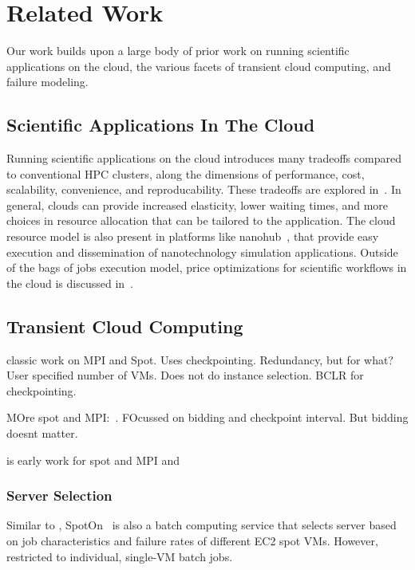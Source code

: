 \section{Related Work}
\label{sec:related}
Our work builds upon a large body of prior work on running scientific applications on the cloud, the various facets of transient cloud computing, and failure modeling. 

\subsection{Scientific Applications In The Cloud}

Running scientific applications on the cloud introduces many tradeoffs compared to conventional HPC clusters, along the dimensions of performance, cost, scalability, convenience, and reproducability.
These tradeoffs are explored in~\cite{iosup_performance_2011, zhai_cloud_2011, marathe2013comparative, galante_analysis_2016, benedictis_cloud-aware_2014}.
In general, clouds can provide increased elasticity, lower waiting times, and more choices in resource allocation that can be tailored to the application.
The cloud resource model is also present in platforms like nanohub~\cite{nanohub}, that provide easy execution and dissemination of nanotechnology simulation applications.
Outside of the bags of jobs execution model, price optimizations for scientific workflows in the cloud is discussed in~\cite{gari_learning_2019}. 



\subsection{Transient Cloud Computing} 

\cite{marathe2014exploiting} classic work on MPI and Spot.
Uses checkpointing.
Redundancy, but for what?
User specified number of VMs. Does not do instance selection. 
BCLR for checkpointing.



MOre spot and MPI:~\cite{gong_monetary_2015}. FOcussed on bidding and checkpoint interval. But bidding doesnt matter. 


\cite{xiang_spotmpi:_2011} is early work for spot and MPI and 

\subsubsection{Server Selection}
Similar to \sysname, SpotOn~\cite{spoton} is also a batch computing service that selects server based on job characteristics and failure rates of different EC2 spot VMs. However, restricted to individual, single-VM batch jobs. 

